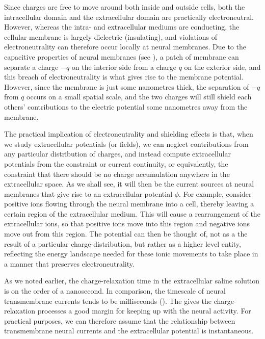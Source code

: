 Since charges are free to move around both inside and outside cells, both the intracellular domain and the extracellular domain are practically electroneutral. However, whereas the intra- and extracellular mediums are conducting, the cellular membrane is largely dielectric (insulating), and violations of electroneutrality can therefore occur locally at neural membranes.
Due to the capacitive properties of neural membranes (see ), a patch of membrane can separate a charge $-q$ on the interior side from a charge $q$ on the exterior side, and this breach of electroneutrality is what gives rise to the membrane potential. However, since the membrane is just some nanometres thick, the separation of $-q$ from $q$ occurs on a small spatial scale, and the two charges will still shield each others' contributions to the electric potential some nanometres away from the membrane. 

The practical implication of electroneutrality and shielding effects is that, when we study extracellular potentials (or fields), we can neglect contributions from any particular distribution of charges, and instead compute extracellular potentials from the constraint or current continuity, or equivalently, the constraint that  there should be no charge accumulation anywhere in the extracellular space. As we shall see, it will then be the current sources at neural membranes that give rise to an extracellular potential $\phi$. For example, consider positive ions flowing through the neural membrane into a cell, thereby leaving a certain region of the extracellular medium. This will cause a rearrangement of the extracellular ions, so that positive ions move into this region and negative ions move out from this region. The potential can then be thought of, not as a the result of a particular charge-distribution, but rather as a higher level entity, reflecting the energy landscape needed for these ionic movements to take place in a manner that preserves electroneutrality. 

As we noted earlier, the charge-relaxation time in the extracellular saline solution is on the order of a nanosecond. In comparison, the timescale of neural transmembrane currents tends to be milliseconds (). The gives the charge-relaxation processes a good margin for keeping up with the neural activity. For practical purposes, we can therefore assume that the relationship between transmembrane neural currents and the extracellular potential is instantaneous.


